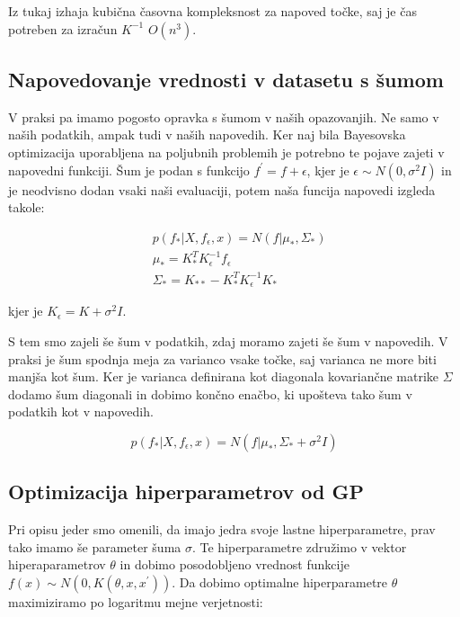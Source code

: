 \documentclass[a4paper, 12pt]{book}
\begin{document}
Iz tukaj izhaja kubična časovna kompleksnost za napoved točke, saj je čas potreben za izračun $K^{-1}$ $O(n^3)$.

\subsection{Napovedovanje vrednosti v datasetu s šumom}

\par V praksi pa imamo pogosto opravka s šumom v naših opazovanjih. 
Ne samo v naših podatkih, ampak tudi v naših napovedih.
Ker naj bila Bayesovska optimizacija uporabljena na poljubnih problemih je potrebno te pojave zajeti v napovedni funkciji.
Šum je podan s funkcijo $f^{'} = f + \epsilon$, kjer je $\epsilon \sim N(0, \sigma^2I)$ in je neodvisno dodan vsaki naši evaluaciji,
potem naša funcija napovedi izgleda takole:

\begin{equation}
\begin{split}
	&p(f_*|X,f_\epsilon,x) = N(f|\mu_*, \Sigma_*) \\
	&\mu_* = K_*^TK_\epsilon^{-1}f_\epsilon \\
	&\Sigma_* = K_{**} - K_*^TK_\epsilon^{-1}K_*
\end{split}
\end{equation}

kjer je $K_\epsilon = K + \sigma^2I$.
\par S tem smo zajeli še šum v podatkih, zdaj moramo zajeti še šum v napovedih. 
V praksi je šum spodnja meja za varianco vsake točke, saj varianca ne more biti manjša kot šum.
Ker je varianca definirana kot diagonala kovariančne matrike $\Sigma$ dodamo šum diagonali in dobimo končno enačbo, ki upošteva tako šum v podatkih kot v napovedih.

\begin{equation}
	p(f_*|X,f_\epsilon,x) = N(f|\mu_*, \Sigma_* + \sigma^2I)
\end{equation}

\subsection{Optimizacija hiperparametrov od GP}

\par Pri opisu jeder smo omenili, da imajo jedra svoje lastne hiperparametre, prav tako imamo še parameter šuma $\sigma$.
Te hiperparametre združimo v vektor hiperaparametrov $\theta$ in dobimo posodobljeno vrednost funkcije $f(x) \sim N(0, K(\theta, x, x^{'}))$.
Da dobimo optimalne hiperparametre $\theta$ maximiziramo po logaritmu mejne verjetnosti:
\end{document}
